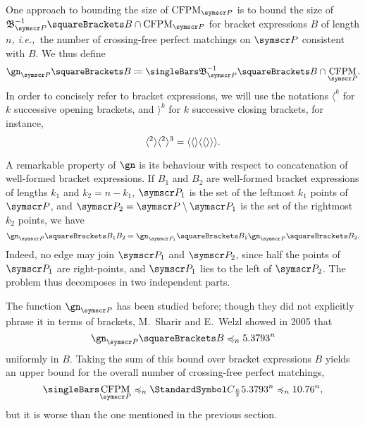 \documentclass[10pt, a4paper, twoside]{basestyle}
\newcommand{\idest}{\emph{, i.e.,\ }}
\DeclareMathOperator{\CFPM}{CFPM}
\newcommand{\CatalanNumber}[1]{\StandardSymbol C_{#1}}
\newcommand{\pointset}{\symscr}
\newcommand{\bracketing}{\mathfrak{B}}
\begin{document}
One approach to bounding the size of $\CFPM_{\pointset P}$ is to bound the size of
$\bracketing_{\pointset P}^{-1}\of{B}\Intersection \CFPM_{\pointset P}$ for bracket expressions $B$ of length $n$\idest the
number of crossing-free perfect matchings on $\pointset P$ consistent with $B$. We thus define
\[\gn_{\pointset P}\of B \DefineAs
\Cardinality{\bracketing_{\pointset P}^{-1}\of{B}\Intersection \CFPM_{\pointset P}}\text.\]
In order to concisely refer to bracket expressions, we will use the notations
$\langle^k$ for $k$ successive opening brackets, and $\rangle^k$ for $k$ successive
closing brackets, for instance,\[
\langle^2\rangle\langle^2\rangle^3 = \langle\langle\rangle\langle\langle\rangle\rangle\rangle
\text.\]

A remarkable property of $\gn$ is its behaviour with respect to concatenation of well-formed bracket expressions.
If $B_1$ and $B_2$ are well-formed bracket expressions of lengths $k_1$ and $k_2=n-k_1$,
$\pointset P_1$ is the set of the leftmost $k_1$ points of $\pointset P$, and
$\pointset P_2=\pointset P\setminus\pointset P_1$ is the set of the
rightmost $k_2$ points, we have\[
\gn_{\pointset P}\of{B_1B_2}=\gn_{\pointset P_1}\of{B_1}\gn_{\pointset P}\of{B_2}\text.
\]
Indeed, no edge may join $\pointset P_1$ and $\pointset P_2$, since half the points of $\pointset P_1$ are right-points,
and $\pointset P_1$ lies to the left of $\pointset P_2$. The problem thus decomposes in two independent parts.

The function $\gn_{\pointset P}$ has been studied before; though they did not explicitly phrase it in terms of brackets,
M.~Sharir and E.~Welzl showed in 2005 \cite{SharirWelzl2006} that\[
\gn_{\pointset P}\of B\preccurlyeq_n5.3793^n
\]
uniformly in $B$. Taking the sum of this bound over bracket expressions $B$ yields an upper bound for the overall number of
crossing-free perfect matchings,\[
\Cardinality{\CFPM_{\pointset P}}
\preccurlyeq_n \CatalanNumber {\frac n 2} 5.3793^n
\preccurlyeq_n 10.76^n\text,
\]
but it is worse than the one mentioned in the previous section.
\label{boundOnLeftRightPerfectMatchings}
\end{document}
